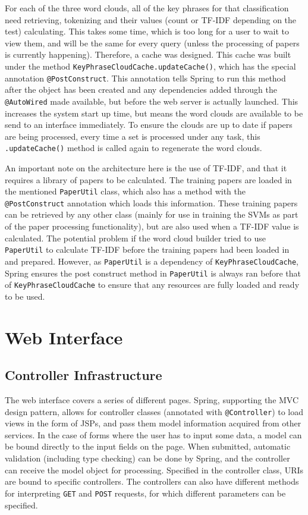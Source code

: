 For each of the three word clouds, all of the key phrases for that classification need retrieving, tokenizing and their values (count or TF-IDF depending on the test) calculating. This takes some time, which is too long for a user to wait to view them, and will be the same for every query (unless the processing of papers is currently happening). Therefore, a cache was designed. This cache was built under the method \texttt{KeyPhraseCloudCache.updateCache()}, which has the special annotation \texttt{@PostConstruct}. This annotation tells Spring to run this method after the object has been created and any dependencies added through the \texttt{@AutoWired} made available, but before the web server is actually launched. This increases the system start up time, but means the word clouds are available to be send to an interface immediately. To ensure the clouds are up to date if papers are being processed, every time a set is processed under any task, this \texttt{.updateCache()} method is called again to regenerate the word clouds.

An important note on the architecture here is the use of TF-IDF, and that it requires a library of papers to be calculated. The training papers are loaded in the mentioned \texttt{PaperUtil} class, which also has a method with the \texttt{@PostConstruct} annotation which loads this information. These training papers can be retrieved by any other class (mainly for use in training the SVMs as part of the paper processing functionality), but are also used when a TF-IDF value is calculated. The potential problem if the word cloud builder tried to use \texttt{PaperUtil} to calculate TF-IDF before the training papers had been loaded in and prepared. However, as \texttt{PaperUtil} is a dependency of \texttt{KeyPhraseCloudCache}, Spring ensures the post construct method in \texttt{PaperUtil} is always ran before that of \texttt{KeyPhraseCloudCache} to ensure that any resources are fully loaded and ready to be used. 

\section{Web Interface}
\subsection*{Controller Infrastructure}
The web interface covers a series of different pages. Spring, supporting the MVC design pattern, allows for controller classes (annotated with \texttt{@Controller}) to load views in the form of JSPs, and pass them model information acquired from other services. In the case of forms where the user has to input some data, a model can be bound directly to the input fields on the page. When submitted, automatic validation (including type checking) can be done by Spring, and the controller can receive the model object for processing. Specified in the controller class, URIs are bound to specific controllers. The controllers can also have different methods for interpreting \texttt{GET} and \texttt{POST} requests, for which different parameters can be specified.

